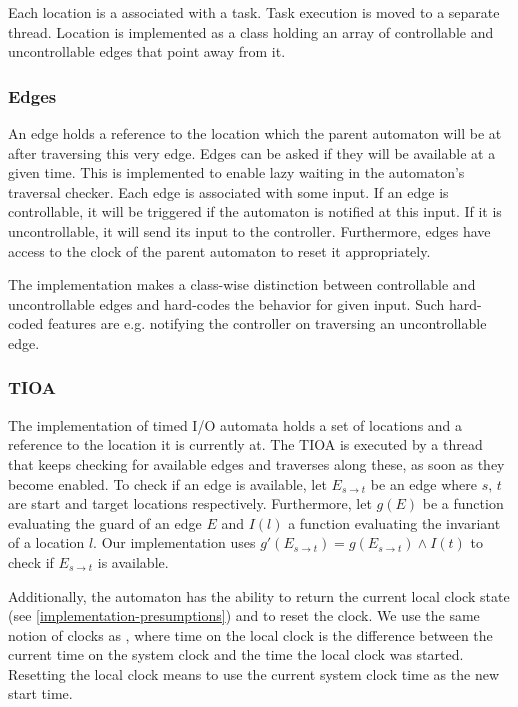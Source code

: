 Each location is a associated with a task. Task execution is moved
to a separate thread. Location is implemented as a class holding an
array of controllable and uncontrollable edges that point away from
it.


\subsubsection{Edges}

An edge holds a reference to the location which the parent automaton
will be at after traversing this very edge. Edges can be asked if
they will be available at a given time. This is implemented to enable
lazy waiting in the automaton's traversal checker. Each edge is associated
with some input. If an edge is controllable, it will be triggered
if the automaton is notified at this input. If it is uncontrollable,
it will send its input to the controller. Furthermore, edges have
access to the clock of the parent automaton to reset it appropriately.

The implementation makes a class-wise distinction between controllable
and uncontrollable edges and hard-codes the behavior for given input.
Such hard-coded features are e.g. notifying the controller on traversing
an uncontrollable edge.


\subsubsection{TIOA}

The implementation of timed I/O automata holds a set of locations
and a reference to the location it is currently at. The TIOA is executed
by a thread that keeps checking for available edges and traverses
along these, as soon as they become enabled. To check if an edge is
available, let $E_{s\rightarrow t}$ be an edge where $s,\, t$ are
start and target locations respectively. Furthermore, let $g(E)$
be a function evaluating the guard of an edge $E$ and $I(l)$ a function
evaluating the invariant of a location $l$. Our implementation uses
$g'(E_{s\rightarrow t})=g(E_{s\rightarrow t})\wedge I(t)$ to check
if $E_{s\rightarrow t}$ is available.

Additionally, the automaton has the ability to return the current
local clock state (see \ref{implementation-presumptions}) and to
reset the clock. We use the same notion of clocks as \cite{amnell_code_2002},
where time on the local clock is the difference between the current
time on the system clock and the time the local clock was started.
Resetting the local clock means to use the current system clock time
as the new start time.


